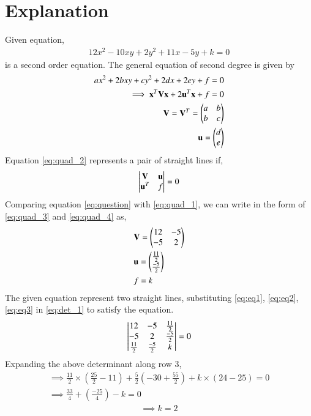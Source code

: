 \documentclass[journal,12pt,twocolumn]{IEEEtran}
\begin{document}
\section{Explanation}
Given equation,
\begin{align}
12x^2-10xy+2y^2+11x-5y+k =0 \label{eq:question}
\end{align}
is a second order equation.
The general equation of second degree is given by
\begin{align}
    ax^2+2bxy+cy^2+2dx+2ey+f=0\label{eq:quad_1}\\
    \implies \mathbf{x}^T\mathbf{V}\mathbf{x}+2\mathbf{u}^T\mathbf{x}+f=0 \label{eq:quad_2}\\
    \mathbf{V}=\mathbf{V}^T=\begin{pmatrix}a & b \\ b & c\end{pmatrix} \label{eq:quad_3}\\
    \mathbf{u}=\begin{pmatrix}d \\ e\end{pmatrix} \label{eq:quad_4}
\end{align}
Equation \eqref{eq:quad_2} represents a pair of straight lines if,
\begin{align}
\begin{vmatrix}\mathbf{V} & \mathbf{u}\\\mathbf{u}^T & f\end{vmatrix}=0 \label{eq:det_1}
\end{align}
Comparing equation \eqref{eq:question} with \eqref{eq:quad_1}, we can write in the form of \eqref{eq:quad_3} and \eqref{eq:quad_4} as,
\begin{align}
    &\mathbf{V}=\begin{pmatrix}12 & -5 \\ -5 & 2\end{pmatrix} \label{eq:eq1}\\ 
    &\mathbf{u}=\begin{pmatrix}\frac{11}{2} \\ \frac{-5}{2}\end{pmatrix} \label{eq:eq2}\\
    & f=k \label{eq:eq3}
\end{align}
The given equation represent two straight lines, substituting \eqref{eq:eq1}, \eqref{eq:eq2}, \eqref{eq:eq3} in \eqref{eq:det_1} to satisfy the equation.
\begin{align}
    \begin{vmatrix}12 & -5 & \frac{11}{2} \\ -5 & 2 & \frac{-5}{2}\\\frac{11}{2} & \frac{-5}{2} & k\end{vmatrix} = 0 \label{eq:solu_1}
\end{align}
Expanding the above determinant along row 3, 
\begin{multline}
    \implies \frac{11}{2}\times(\frac{25}{2}-11) + \frac{5}{2}(-30 + \frac{55}{2}) + k\times(24-25) = 0 \\
\implies \frac{33}{4} + (\frac{-25}{4}) - k = 0 
\end{multline}
\begin{align}
    \implies \boxed{k=2} \label{eq:result}
\end{align}
\end{document}
